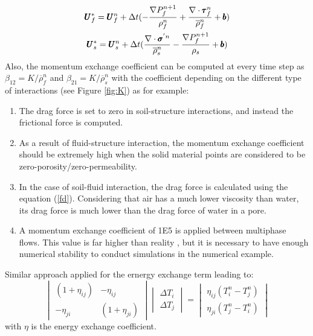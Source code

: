\documentclass[preprint,12pt]{elsarticle}
\begin{document}
%
\begin{equation}
\begin{gathered}
\pmb{U}_{f}^{*} = \pmb{U}_{f}^{n} + \Delta{t} (-\frac{\nabla P_{f}^{n+1}}{\rho_f^n}  + \frac{\nabla \cdot \pmb{\tau}_f^{n}}{\overline{\rho}^n_{f}} + \pmb{b}) \\
\pmb{U}_{s}^{*} = \pmb{U}_{s}^{n} + \Delta{t} (\frac{\nabla \cdot \pmb{\sigma}^{'n}}{\overline{\rho}^n_{s}}    - \frac{\nabla P_{f}^{n+1}}{\rho_s}  + \pmb{b})
\end {gathered}
\end {equation}
%
%
Also, the momentum exchange coefficient can be computed at every time step as $\beta_{12} = K/\overline{\rho}_{f}^n$ and $\beta_{21} = K/\overline{\rho}_{s}^n$ with the coefficient depending on the different type of interactions (see Figure \ref{fig:K}) as for example: \\
\begin{enumerate}
\item The drag force is set to zero in soil-structure interactions, and instead the frictional force is computed.
\item As a result of fluid-structure interaction, the momentum exchange coefficient should be extremely high when the solid material points are considered to be zero-porosity/zero-permeability.
\item In the case of soil-fluid interaction, the drag force is calculated using the equation (\ref{fd}). Considering that air has a much lower viscosity than water, its drag force is much lower than the drag force of water in a pore.
\item A momentum exchange coefficient of 1E5 is applied between multiphase flows. This value is far higher than reality \cite{Stewart1974}, but it is necessary to have enough numerical stability to conduct simulations in the numerical example.
\end {enumerate}
Similar approach applied for the ernergy exchange term leading to:
%
%
\[ \begin{vmatrix} (1 + \eta_{ij})  &  -\eta_{ij} \\
                  -\eta_{ji}       &  (1 + \eta_{ji})
    \end {vmatrix}
    \begin{vmatrix} \Delta T_{i} \\
                    \Delta T_{j}
    \end {vmatrix}
    =
    \begin{vmatrix}  \eta_{ij}(T_{i}^{n} - T_{j}^{n}) \\
                    \eta_{ji}(T_{j}^{n} - T_i^{n})
    \end {vmatrix}                
\]
with $\eta$ is the energy exchange coefficient.\\
\end{document}
